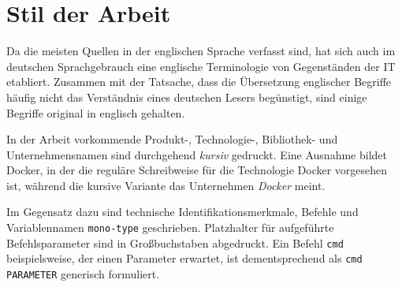 \documentclass[../main.tex]{subfiles}
\begin{document}
  \section{Stil der Arbeit}
    Da die meisten Quellen in der englischen Sprache verfasst sind, hat sich auch im deutschen Sprachgebrauch eine englische Terminologie von Gegenständen der IT etabliert. Zusammen mit der Tatsache, dass die Übersetzung englischer Begriffe häufig nicht das Verständnis eines deutschen Lesers begünstigt, sind einige Begriffe original in englisch gehalten.

    In der Arbeit vorkommende Produkt-, Technologie-, Bibliothek- und Unternehmensnamen sind durchgehend \emph{kursiv} gedruckt. Eine Ausnahme bildet Docker, in der die reguläre Schreibweise für die Technologie Docker vorgesehen ist, während die kursive Variante das Unternehmen \emph{Docker} meint.

    Im Gegensatz dazu sind technische Identifikationsmerkmale, Befehle und Variablennamen \texttt{mono-type} geschrieben. Platzhalter für aufgeführte Befehlsparameter sind in Großbuchstaben abgedruckt. Ein Befehl \texttt{cmd} beispielsweise, der einen Parameter erwartet, ist dementsprechend als \texttt{cmd PARAMETER} generisch formuliert.
\end{document}
